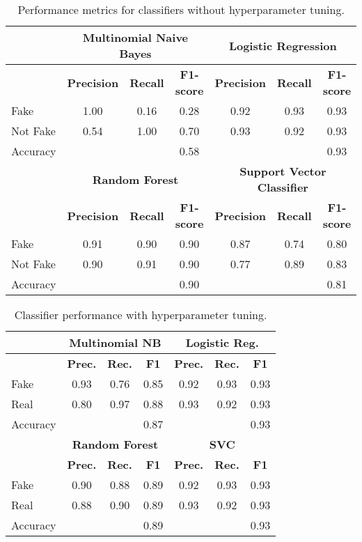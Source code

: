 \documentclass[conference]{IEEEtran}
\begin{document}
\begin{table}[!t]
\caption{Performance metrics for classifiers without hyperparameter tuning.}
\label{tab:no_hyperparam_summary}
\begin{center}
\begin{tabular}{|l|ccc|ccc|}
\hline
& \multicolumn{3}{c|}{\textbf{Multinomial Naive Bayes}} & \multicolumn{3}{c|}{\textbf{Logistic Regression}} \\
\hline
& \textbf{Precision} & \textbf{Recall} & \textbf{F1-score} & \textbf{Precision} & \textbf{Recall} & \textbf{F1-score} \\
\hline
Fake & 1.00 & 0.16 & 0.28 & 0.92 & 0.93 & 0.93 \\
Not Fake & 0.54 & 1.00 & 0.70 & 0.93 & 0.92 & 0.93 \\
Accuracy & & & 0.58 & & & 0.93 \\
\hline
& \multicolumn{3}{c|}{\textbf{Random Forest}} & \multicolumn{3}{c|}{\textbf{Support Vector Classifier}} \\
\hline
& \textbf{Precision} & \textbf{Recall} & \textbf{F1-score} & \textbf{Precision} & \textbf{Recall} & \textbf{F1-score} \\
\hline
Fake & 0.91 & 0.90 & 0.90 & 0.87 & 0.74 & 0.80 \\
Not Fake & 0.90 & 0.91 & 0.90 & 0.77 & 0.89 & 0.83 \\
Accuracy & & & 0.90 & & & 0.81 \\
\hline
\end{tabular}
\end{center}
\end{table}

\begin{table}[!t]
\caption{Classifier performance with hyperparameter tuning.}
\label{tab:hyperparam_summary}
\begin{center}
\begin{tabular}{|l|ccc|ccc|}
\hline
& \multicolumn{3}{c|}{\textbf{Multinomial NB}} & \multicolumn{3}{c|}{\textbf{Logistic Reg.}} \\
\hline
& \textbf{Prec.} & \textbf{Rec.} & \textbf{F1} & \textbf{Prec.} & \textbf{Rec.} & \textbf{F1} \\
\hline
Fake & 0.93 & 0.76 & 0.85 & 0.92 & 0.93 & 0.93 \\
Real & 0.80 & 0.97 & 0.88 & 0.93 & 0.92 & 0.93 \\
Accuracy & & & 0.87 & & & 0.93 \\
\hline
& \multicolumn{3}{c|}{\textbf{Random Forest}} & \multicolumn{3}{c|}{\textbf{SVC}} \\
\hline
& \textbf{Prec.} & \textbf{Rec.} & \textbf{F1} & \textbf{Prec.} & \textbf{Rec.} & \textbf{F1} \\
\hline
Fake & 0.90 & 0.88 & 0.89 & 0.92 & 0.93 & 0.93 \\
Real & 0.88 & 0.90 & 0.89 & 0.93 & 0.92 & 0.93 \\
Accuracy & & & 0.89 & & & 0.93 \\
\hline
\end{tabular}
\end{center}
\end{table}
\end{document}
